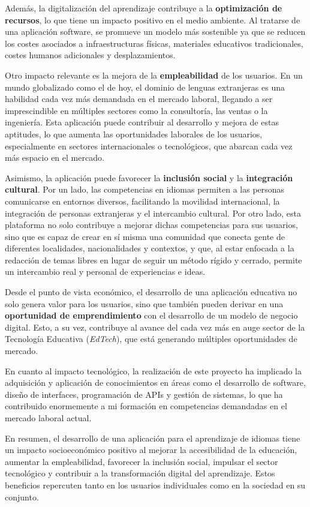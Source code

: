 Además, la digitalización del aprendizaje contribuye a la \textbf{optimización de recursos}, lo que tiene un impacto positivo en el medio ambiente. Al tratarse de una aplicación software, se promueve un modelo más sostenible ya que se reducen los costes asociados a infraestructuras físicas, materiales educativos tradicionales, costes humanos adicionales y desplazamientos.

Otro impacto relevante es la mejora de la \textbf{empleabilidad} de los usuarios. En un mundo globalizado como el de hoy, el dominio de lenguas extranjeras es una habilidad cada vez más demandada en el mercado laboral, llegando a ser imprescindible en múltiples sectores como la consultoría, las ventas o la ingeniería. Esta aplicación puede contribuir al desarrollo y mejora de estas aptitudes, lo que aumenta las oportunidades laborales de los usuarios, especialmente en sectores internacionales o tecnológicos, que abarcan cada vez más espacio en el mercado.

Asimismo, la aplicación puede favorecer la \textbf{inclusión social} y la \textbf{integración cultural}. Por un lado, las competencias en idiomas permiten a las personas comunicarse en entornos diversos, facilitando la movilidad internacional, la integración de personas extranjeras y el intercambio cultural. Por otro lado, esta plataforma no solo contribuye a mejorar dichas competencias para sus usuarios, sino que es capaz de crear en sí misma una comunidad que conecta gente de diferentes localidades, nacionalidades y contextos, y que, al estar enfocada a la redacción de temas libres en lugar de seguir un método rígido y cerrado, permite un intercambio real y personal de experiencias e ideas.

Desde el punto de vista económico, el desarrollo de una aplicación educativa no solo genera valor para los usuarios, sino que también pueden derivar en una \textbf{oportunidad de emprendimiento} con el desarrollo de un modelo de negocio digital. Esto, a su vez, contribuye al avance del cada vez más en auge sector de la Tecnología Educativa (\textit{EdTech}), que está generando múltiples oportunidades de mercado.

En cuanto al impacto tecnológico, la realización de este proyecto ha implicado la adquisición y aplicación de conocimientos en áreas como el desarrollo de software, diseño de interfaces, programación de APIs y gestión de sistemas, lo que ha contribuido enormemente a mi formación en competencias demandadas en el mercado laboral actual.

En resumen, el desarrollo de una aplicación para el aprendizaje de idiomas tiene un impacto socioeconómico positivo al mejorar la accesibilidad de la educación, aumentar la empleabilidad, favorecer la inclusión social, impulsar el sector tecnológico y contribuir a la transformación digital del aprendizaje. Estos beneficios repercuten tanto en los usuarios individuales como en la sociedad en su conjunto.